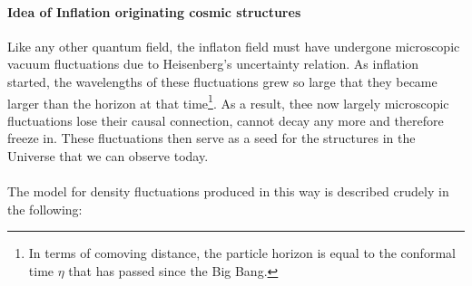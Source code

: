 \paragraph{Idea of Inflation originating cosmic structures}
Like any other quantum field, the inflaton field must have undergone microscopic vacuum fluctuations due to Heisenberg's uncertainty relation. As inflation started, the wavelengths of these fluctuations grew so large that they became larger than the horizon at that time\footnote{In terms of comoving distance, the particle horizon is equal to the conformal time $\eta$ that has passed since the Big Bang.}. As a result, thee now largely microscopic fluctuations lose their causal connection, cannot decay any more and therefore freeze in. These fluctuations then serve as a seed for the structures in the Universe that we can observe today.\\
\\
The model for density fluctuations produced in this way is described crudely in the following:
